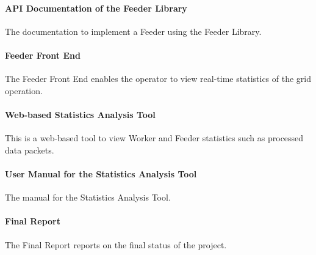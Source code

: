 \paragraph{API Documentation of the Feeder Library} The documentation to implement a Feeder using the Feeder Library.
\paragraph{Feeder Front End} The Feeder Front End enables the operator to view real-time statistics of the grid operation.
\paragraph{Web-based Statistics Analysis Tool} This is a web-based tool to view Worker and Feeder statistics such as processed data packets.
\paragraph{User Manual for the Statistics Analysis Tool} The manual for the Sta\-tis\-tics Analysis Tool.
\paragraph{Final Report} The Final Report reports on the final status of the project.
